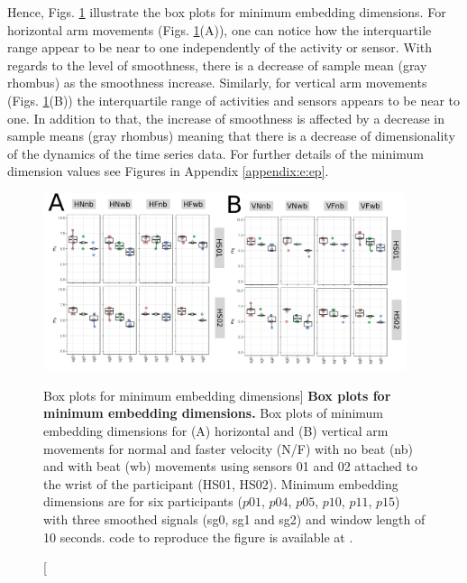 Hence, Figs. \ref{fig:CAO-hii} illustrate the box plots for minimum 
embedding dimensions.
For horizontal arm movements (Figs. \ref{fig:CAO-hii}(A)), 
one can notice how the interquartile range  
appear to be near to one independently of the 
activity or sensor. 
With regards to the level of smoothness,
there is a decrease of sample mean (gray rhombus) 
as the smoothness increase.  
Similarly, for vertical arm movements (Figs. \ref{fig:CAO-hii}(B))
the interquartile range of activities and sensors 
appears to be near to one. In addition to that, 
the increase of smoothness is affected by a decrease 
in sample means (gray rhombus) meaning that there is 
a decrease of dimensionality of the dynamics of 
the time series data.
For further details of the minimum dimension values see
Figures in Appendix \ref{appendix:e:ep}.
\begin{figure}
\centering
\includegraphics[width=0.95\textwidth]{fig_5_03}
	\caption
	[Box plots for minimum embedding dimensions]{
	{\bf Box plots for minimum embedding dimensions.} 
		Box plots of minimum embedding dimensions for 
		(A) horizontal and (B) vertical arm movements for
		normal  and faster velocity (N/F) with no beat (nb) 
		and with beat (wb) movements
		using sensors 01 and 02 attached to the wrist of the 
		participant (HS01, HS02).
		Minimum embedding dimensions are for six participants 
		($p01$, $p04$, $p05$, $p10$, $p11$, $p15$) with three 
		smoothed signals (sg0, sg1 and sg2)
		and window length of 10 seconds.
	\R code to reproduce the figure is available at 
	.
        }
    \label{fig:CAO-hii}
\end{figure}

